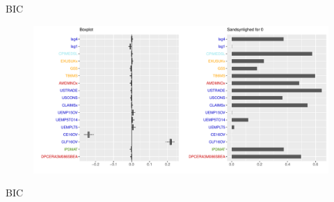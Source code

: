 \begin{frame}{BIC}
\begin{figure}[!htb]
        \includegraphics[width=1\linewidth, height=0.7\textheight]{slides/boxplot_lasso_coord_bic.pdf}
\end{figure}
\end{frame}

\begin{frame}{BIC}

\end{frame}
